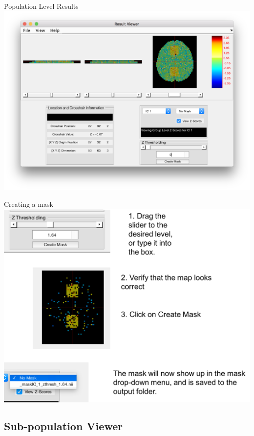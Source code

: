 \documentclass[11pt]{beamer}
\begin{document}
\begin{frame}{Population Level Results}
		\includegraphics[width=1\linewidth]{figs/viewerPop}
\end{frame}

\begin{frame}{Creating a mask}
		\includegraphics[width=0.8\linewidth]{figs/maskExplanation}
\end{frame}

\subsection{Sub-population Viewer}
\end{document}
